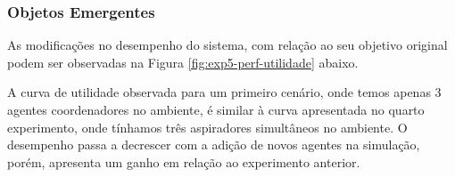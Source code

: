 \subsubsection{Objetos Emergentes}

As modificações no desempenho do sistema, com relação ao seu objetivo original podem ser observadas na Figura \ref{fig:exp5-perf-utilidade} abaixo.

\begin{figure}[h!]
    \centering
\end{figure}

A curva de utilidade observada para um primeiro cenário, onde temos apenas 3 agentes coordenadores no ambiente, é similar à curva apresentada no quarto experimento, onde tínhamos três aspiradores simultâneos no ambiente. O desempenho passa a decrescer com a adição de novos agentes na simulação, porém, apresenta um ganho em relação ao experimento anterior.


\begin{figure}[h!]
    \centering
\end{figure}

